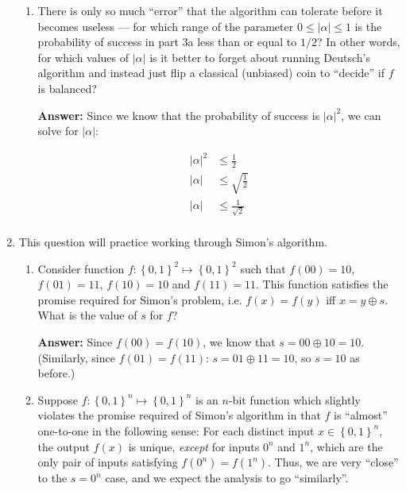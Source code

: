 \documentclass{article}
\newcommand{\set}[1]{{\left\{#1\right\}}}    %
\newcommand{\abs}[1]{\left\lvert #1 \right\rvert}
\begin{document}
\begin{enumerate}
\begin{enumerate}
          \item There is only so much ``error'' that the algorithm can tolerate before it becomes useless --- for which range of the parameter $0\leq\abs{\alpha}\leq 1$ is the probability of success in part 3a less than or equal to $1/2$? In other words, for which values of $\abs{\alpha}$ is it better to forget about running Deutsch's algorithm and instead just flip a classical (unbiased) coin to ``decide'' if $f$ is balanced?

                \textbf{Answer:} Since we know that the probability of success is $\abs{\alpha}^2$, we can solve for $\abs{\alpha}$:

                $$\begin{aligned}
                    \abs{\alpha}^2 & \leq \frac{1}{2}        \\
                    \abs{\alpha}   & \leq \sqrt{\frac{1}{2}} \\
                    \abs{\alpha}   & \leq \frac{1}{\sqrt{2}} \\
                  \end{aligned}$$
        \end{enumerate}
  \item This question will practice working through Simon's algorithm.
        \begin{enumerate}
          \item Consider function $f:\set{0,1}^2\mapsto\set{0,1}^2$ such that $f(00)=10$, $f(01)=11$, $f(10)=10$ and $f(11)=11$. This function satisfies the promise required for Simon's problem, i.e. $f(x)=f(y)$ iff $x=y\oplus s$. What is the value of $s$ for $f$?

                \textbf{Answer:} Since $f(00)=f(10)$, we know that $s=00\oplus 10=10$. (Similarly, since $f(01)=f(11)$: $s=01\oplus 11=10$, so $s=10$ as before.)

          \item Suppose $f:\set{0,1}^n\mapsto \set{0,1}^n$ is an $n$-bit function which slightly violates the promise required of Simon's algorithm in that $f$ is ``almost'' one-to-one in the following sense: For each distinct input $x\in\set{0,1}^n$, the output $f(x)$ is unique, \emph{except} for inputs $0^n$ and $1^n$, which are the only pair of inputs satisfying $f(0^n)=f(1^n)$. Thus, we are very ``close'' to the $s=0^n$ case, and we expect the analysis to go ``similarly''.


\end{enumerate}
\end{enumerate}
\end{document}
